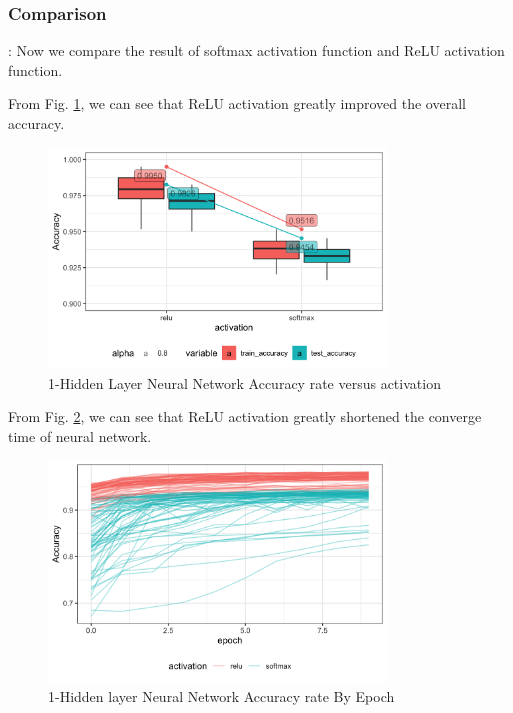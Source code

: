 \documentclass[8pt]{beamer}
\begin{document}
\subsubsection{Comparison}
\begin{frame}[allowframebreaks]{\secname : \subsecname}{\subsubsecname}
Now we compare the result of softmax activation function and ReLU activation function.

From Fig. \ref{1-Hidden Layer Neural Network Accuracy rate versus activation}, we can see that ReLU activation greatly improved the overall accuracy.
\begin{figure}[htbp]
\centerline{\includegraphics[width=0.8\textwidth]{figure/1-Hidden Layer Neural Network Accuracy rate versus activation.png}} 
\caption{1-Hidden Layer Neural Network Accuracy rate versus activation}
\label{1-Hidden Layer Neural Network Accuracy rate versus activation}
\vspace{-1.5em}
\end{figure}

From Fig. \ref{1-Hidden layer Neural Network Accuracy rate By Epoch}, we can see that ReLU activation greatly shortened the converge time of neural network.
\begin{figure}[htbp]
\centerline{\includegraphics[width=0.8\textwidth]{figure/1-Hidden layer Neural Network Accuracy rate By Epoch.png}}
\caption{1-Hidden layer Neural Network Accuracy rate By Epoch}
\label{1-Hidden layer Neural Network Accuracy rate By Epoch}
\vspace{-1.5em}
\end{figure}
\end{frame}
\end{document}
